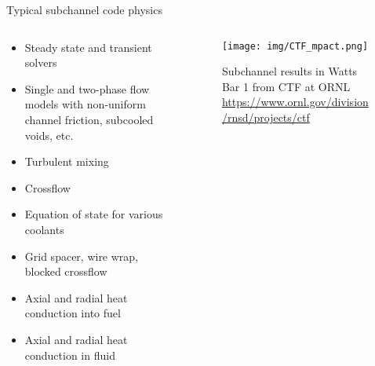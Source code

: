 \documentclass[pdf,aspectratio=169]{beamer}
\begin{document}
\begin{frame}{Typical subchannel code physics}
\begin{columns}
    \begin{column}{0.6\textwidth}
        \begin{itemize}
            \item Steady state and transient solvers
            \item Single and two-phase flow models with non-uniform channel friction,
                subcooled voids, etc.
            \item Turbulent mixing 
            \item Crossflow
            \item Equation of state for various coolants
            \item Grid spacer, wire wrap, blocked crossflow
            \item Axial and radial heat conduction into fuel
            \item Axial and radial heat conduction in fluid
        \end{itemize}
    \end{column}
    \begin{column}{0.4\textwidth}
        \begin{figure}[ht]
        \centering
            \texttt{[image: img/CTF\_mpact.png]}
            \caption{\tiny Subchannel results in Watts Bar 1 from CTF at ORNL \url{https://www.ornl.gov/division/rnsd/projects/ctf}}
        \end{figure}
    \end{column}
\end{columns}
\end{frame}
\end{document}
